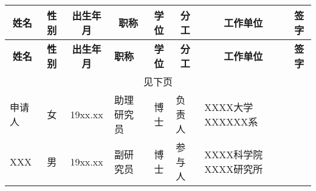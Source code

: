 \begin{center}
	\begin{longtable}{|m{48pt}|c|c|m{36pt}|c|m{36pt}|m{72pt}|c|}
		\hline
		\multicolumn{1}{|c|}{\bf 姓名} & {\bf 性别} & {\bf  出生年月} & \multicolumn{1}{c|}{\bf 职称} & {\bf 学位} & \multicolumn{1}{|c|}{\bf 分工} & \multicolumn{1}{c|}{\bf 工作单位} & {\bf  签字}\\
		\endfirsthead
		
		\hline
			\multicolumn{1}{|c|}{\bf 姓名} & {\bf 性别} & {\bf  出生年月} & {\bf 职称} & \multicolumn{1}{|c|}{\bf 学位} & \multicolumn{1}{|c|}{\bf 分工} & \multicolumn{1}{|c|}{\bf 工作单位} & {\bf  签字}\\
		\endhead
		
		\multicolumn{8}{|c|}{见下页}\\
		\hline
		\endfoot
		
		\hline
		\endlastfoot
	
	
		\hline
		申请人 & 女 &19xx.xx & 助理研究员 & 博士 & 负责人 & XXXX大学XXXXXX系	&  \\
		\hline
		XXX & 男 &19xx.xx & 副研究员 & 博士 & 参与人 &  XXXX科学院XXXX研究所	&  \\
		
	\end{longtable}
\end{center}
